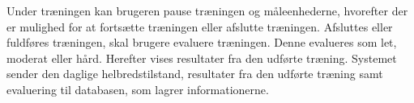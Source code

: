 Under træningen kan brugeren pause træningen og måleenhederne, hvorefter der er mulighed for at fortsætte træningen eller afslutte træningen. Afsluttes eller fuldføres træningen, skal brugere evaluere træningen. Denne evalueres som let, moderat eller hård. Herefter vises resultater fra den udførte træning. Systemet sender den daglige helbredstilstand, resultater fra den udførte træning samt evaluering til databasen, som lagrer informationerne. 